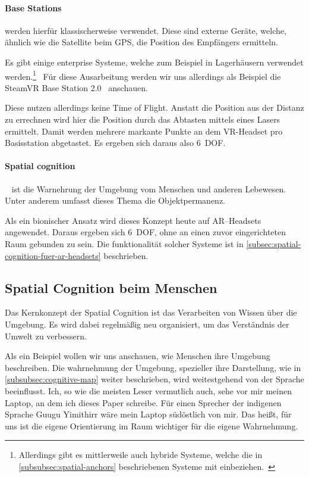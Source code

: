         \paragraph{Base Stations}\label{par:base-stations} werden hierfür klassischerweise verwendet.
            Diese sind externe Geräte, welche, ähnlich wie die Satellite beim GPS, die Position des Empfängers ermitteln.

            Es gibt einige enterprise Systeme, welche zum Beispiel in Lagerhäusern verwendet werden.\footnote{Allerdings gibt es mittlerweile auch hybride Systeme, welche die in \autoref{subsubsec:spatial-anchors} beschriebenen Systeme mit einbeziehen.~\autocite{he-2021}}~\autocite{wikipedia-contributors-2023E}
            Für diese Ausarbeitung werden wir uns allerdings als Beispiel die SteamVR Base Station 2.0~\autocite{valve-corporation-no-date} anschauen.

            Diese nutzen allerdings keine Time of Flight.
            Anstatt die Position aus der Distanz zu errechnen wird hier die Position durch das Abtasten mittels eines Lasers ermittelt.
            Damit werden mehrere markante Punkte an dem VR-Headset pro Basisstation abgetastet.
            Es ergeben sich daraus also 6~DOF\@.

        \paragraph{Spatial cognition}~\autocite{wikipedia-contributors-2023F} ist die Warnehrung der Umgebung vom Menschen und anderen Lebewesen.
            Unter anderem umfasst dieses Thema die Objektpermanenz.

            Als ein bionischer Ansatz wird dieses Konzept heute auf AR--Headsets angewendet.
            Daraus ergeben sich 6~DOF, ohne an einen zuvor eingerichteten Raum gebunden zu sein.
            Die funktionalität solcher Systeme ist in \autoref{subsec:spatial-cognition-fuer-ar-headsets} beschrieben.

\subsection{Spatial Cognition beim Menschen}\label{subsec:spatial-cognition-beim-menschen}
    Das Kernkonzept der Spatial Cognition ist das Verarbeiten von Wissen über die Umgebung. \autocite{wikipedia-contributors-2023F}
    Es wird dabei regelmäßig neu organisiert, um das Verständnis der Umwelt zu verbessern.

    Als ein Beispiel wollen wir uns anschauen, wie Menschen ihre Umgebung beschreiben.
    Die wahrnehmung der Umgebung, spezieller ihre Darstellung, wie in \autoref{subsubsec:cognitive-map} weiter beschrieben, wird weitestgehend von der Sprache beeinflusst. \autocite{haviland-1998}
    Ich, so wie die meisten Leser vermutlich auch, sehe vor mir meinen Laptop, an dem ich dieses Paper schreibe.
    Für einen Sprecher der indigenen Sprache Guugu Yimithirr wäre mein Laptop südöstlich von mir.
    Das heißt, für uns ist die eigene Orientierung im Raum wichtiger für die eigene Wahrnehmung.

